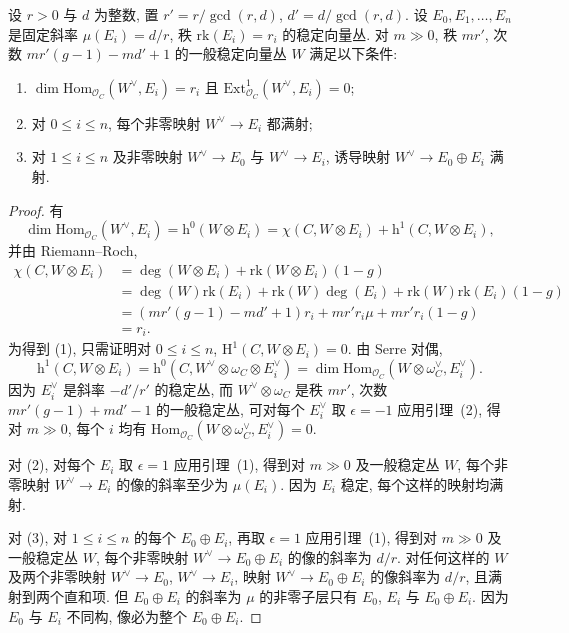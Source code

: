 \begin{lemma}\label{src:9.6.12}
设 $r>0$ 与 $d$ 为整数, 置 $r'=r/\gcd(r,d)$, $d'=d/\gcd(r,d)$. 设 $E_0,E_1,\ldots,E_n$ 是固定斜率 $\mu(E_i)=d/r$, 秩 $\mathrm{rk}(E_i)=r_i$ 的稳定向量丛. 对 $m\gg0$, 秩 $mr'$, 次数 $mr'(g-1)-md'+1$ 的一般稳定向量丛 $W$ 满足以下条件:
\begin{enumerate}[(1)]
\item $\dim\mathrm{Hom}_{\mathcal O_C}(W^\vee,E_i)=r_i$ 且 $\mathrm{Ext}^1_{\mathcal O_C}(W^\vee,E_i)=0$;
\item 对 $0\leq i\leq n$, 每个非零映射 $W^\vee\to E_i$ 都满射;
\item 对 $1\leq i\leq n$ 及非零映射 $W^\vee\to E_0$ 与 $W^\vee\to E_i$, 诱导映射 $W^\vee\to E_0\oplus E_i$ 满射.
\end{enumerate}
\end{lemma}
\begin{proof}
有
\[
\dim\mathrm{Hom}_{\mathcal O_C}(W^\vee,E_i)=\mathrm h^0(W\otimes E_i)=\chi(C,W\otimes E_i)+\mathrm h^1(C,W\otimes E_i),
\]
并由 Riemann--Roch,
\[
\begin{aligned}
\chi(C,W\otimes E_i)&=\deg(W\otimes E_i)+\mathrm{rk}(W\otimes E_i)(1-g)\\
&=\deg(W)\mathrm{rk}(E_i)+\mathrm{rk}(W)\deg(E_i)+\mathrm{rk}(W)\mathrm{rk}(E_i)(1-g)\\
&=(mr'(g-1)-md'+1)r_i+mr'r_i\mu+mr'r_i(1-g)\\
&=r_i.
\end{aligned}
\]
为得到 (1), 只需证明对 $0\leq i\leq n$, $\mathrm H^1(C,W\otimes E_i)=0$. 由 Serre 对偶,
\[
\mathrm h^1(C,W\otimes E_i)=\mathrm h^0(C,W^\vee\otimes\omega_C\otimes E_i^\vee)=\dim\mathrm{Hom}_{\mathcal O_C}(W\otimes\omega_C^\vee,E_i^\vee).
\]
因为 $E_i^\vee$ 是斜率 $-d'/r'$ 的稳定丛, 而 $W^\vee\otimes\omega_C$ 是秩 $mr'$, 次数 $mr'(g-1)+md'-1$ 的一般稳定丛, 可对每个 $E_i^\vee$ 取 $\epsilon=-1$ 应用引理~(2), 得对 $m\gg0$, 每个 $i$ 均有 $\mathrm{Hom}_{\mathcal O_C}(W\otimes\omega_C^\vee,E_i^\vee)=0$.

对 (2), 对每个 $E_i$ 取 $\epsilon=1$ 应用引理~(1), 得到对 $m\gg0$ 及一般稳定丛 $W$, 每个非零映射 $W^\vee\to E_i$ 的像的斜率至少为 $\mu(E_i)$. 因为 $E_i$ 稳定, 每个这样的映射均满射.

对 (3), 对 $1\leq i\leq n$ 的每个 $E_0\oplus E_i$, 再取 $\epsilon=1$ 应用引理~(1), 得到对 $m\gg0$ 及一般稳定丛 $W$, 每个非零映射 $W^\vee\to E_0\oplus E_i$ 的像的斜率为 $d/r$. 对任何这样的 $W$ 及两个非零映射 $W^\vee\to E_0$, $W^\vee\to E_i$, 映射 $W^\vee\to E_0\oplus E_i$ 的像斜率为 $d/r$, 且满射到两个直和项. 但 $E_0\oplus E_i$ 的斜率为 $\mu$ 的非零子层只有 $E_0$, $E_i$ 与 $E_0\oplus E_i$. 因为 $E_0$ 与 $E_i$ 不同构, 像必为整个 $E_0\oplus E_i$.
\end{proof}

